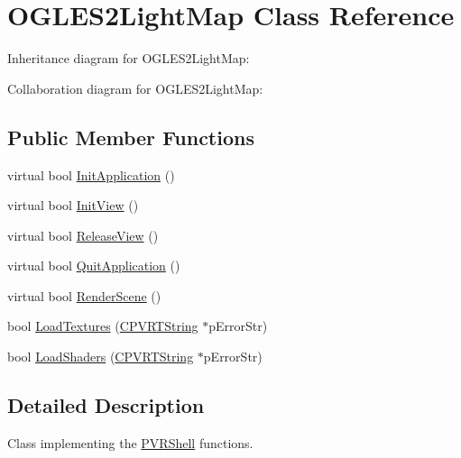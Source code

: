 \hypertarget{class_o_g_l_e_s2_light_map}{\section{O\+G\+L\+E\+S2\+Light\+Map Class Reference}
\label{class_o_g_l_e_s2_light_map}
}


Inheritance diagram for O\+G\+L\+E\+S2\+Light\+Map\+:


Collaboration diagram for O\+G\+L\+E\+S2\+Light\+Map\+:
\subsection*{Public Member Functions}
\begin{DoxyCompactItemize}
\item 
virtual bool \hyperlink{class_o_g_l_e_s2_light_map_a2bfd827e4b77d1b20118ad3d5a659b17}{Init\+Application} ()
\item 
virtual bool \hyperlink{class_o_g_l_e_s2_light_map_a19f23580c0a99c0ef9ba0db9f7c5c568}{Init\+View} ()
\item 
virtual bool \hyperlink{class_o_g_l_e_s2_light_map_a987002042458037be2df19f473984ae3}{Release\+View} ()
\item 
virtual bool \hyperlink{class_o_g_l_e_s2_light_map_a584a84798b9a6767c841c8b1f743a832}{Quit\+Application} ()
\item 
virtual bool \hyperlink{class_o_g_l_e_s2_light_map_a9b6b8054c370fd7a9b3b17cffddbde65}{Render\+Scene} ()
\item 
bool \hyperlink{class_o_g_l_e_s2_light_map_a98c2df4961ad283a0f2071240c83db97}{Load\+Textures} (\hyperlink{class_c_p_v_r_t_string}{C\+P\+V\+R\+T\+String} $\ast$p\+Error\+Str)
\item 
bool \hyperlink{class_o_g_l_e_s2_light_map_a95981e676d22de65f1a1cabc483780cf}{Load\+Shaders} (\hyperlink{class_c_p_v_r_t_string}{C\+P\+V\+R\+T\+String} $\ast$p\+Error\+Str)
\end{DoxyCompactItemize}


\subsection{Detailed Description}


 Class implementing the \hyperlink{class_p_v_r_shell}{P\+V\+R\+Shell} functions. 

